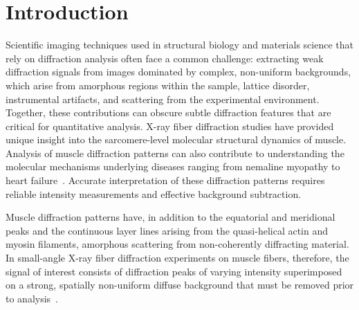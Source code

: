 \documentclass[iucr]{iucrjournals}
\begin{document}




\section{Introduction}
\label{sec:introduction}



Scientific imaging techniques used in structural biology and materials science that rely on diffraction analysis often face a common challenge: extracting weak diffraction signals from images dominated by complex, non-uniform backgrounds, which arise from amorphous regions within the sample, lattice disorder, instrumental artifacts, and scattering from the experimental environment. Together, these contributions can obscure subtle diffraction features that are critical for quantitative analysis. X-ray fiber diffraction studies have provided unique insight into the sarcomere-level molecular structural dynamics of muscle. Analysis of muscle diffraction patterns can also contribute to understanding the molecular mechanisms underlying diseases ranging from nemaline myopathy to heart failure~\cite{MaIrving2022}. Accurate interpretation of these diffraction patterns requires reliable intensity measurements and effective background subtraction.

Muscle diffraction patterns have, in addition to the equatorial and meridional peaks and the continuous layer lines arising from the quasi-helical actin and myosin filaments, amorphous scattering from non-coherently diffracting material. In small-angle X-ray fiber diffraction experiments on muscle fibers, therefore, the signal of interest consists of diffraction peaks of varying intensity superimposed on a strong, spatially non-uniform diffuse background that must be removed prior to analysis~\cite{squire2003ccp13_software}.
\end{document}
